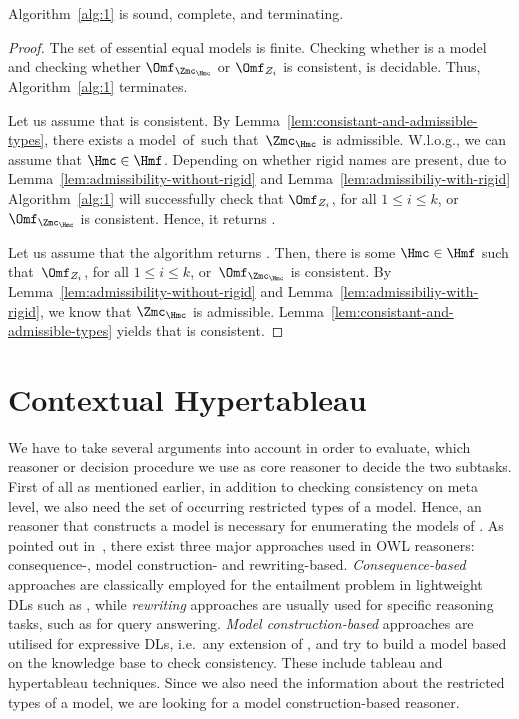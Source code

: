 \begin{lemma}\label{lem:alg1-sound-complete-terminating}
  Algorithm~\ref{alg:1} is sound, complete, and terminating.
\end{lemma}
\begin{proof}
  The set of essential equal models is finite. Checking whether \Hmc is a model and checking whether
  $\Omf_{\Zmc_{\Hmc}}$ or $\Omf_{Z_{i}}$ is consistent, is decidable. Thus, Algorithm~\ref{alg:1}
  terminates.

  Let us assume that \Bmf is consistent. By Lemma~\ref{lem:consistant-and-admissible-types}, there
  exists a model~\Hmc of~\Bmfb such that~$\Zmc_{\Hmc}$ is admissible. W.l.o.g., we can assume that
  $\Hmc\in\Hmf$. 
  Depending on whether rigid names are present, due to
  Lemma~\ref{lem:admissibility-without-rigid} and Lemma~\ref{lem:admissibiliy-with-rigid} Algorithm~\ref{alg:1} will successfully check that
  $\Omf_{Z_{i}}$, for all $1\leq i \leq k$, or $\Omf_{\Zmc_{\Hmc}}$ is consistent. Hence, it
  returns \true.

  Let us assume that the algorithm returns \true. Then, there is some $\Hmc\in\Hmf$ such that~$\Omf_{Z_{i}}$,
  for all $1\leq i \leq k$, or~$\Omf_{\Zmc_{\Hmc}}$ is consistent. By
  Lemma~\ref{lem:admissibility-without-rigid} and Lemma~\ref{lem:admissibiliy-with-rigid}, we know
  that $\Zmc_{\Hmc}$ is admissible. Lemma~\ref{lem:consistant-and-admissible-types} yields that \Bmf
  is consistent.
\end{proof}



\section{Contextual Hypertableau}
\label{sec:using-hypertableau}

We have to take several arguments into account in order to evaluate, which reasoner or decision
procedure we use as core reasoner to decide the two subtasks.
%
First of all as mentioned earlier, in addition to checking consistency on meta level, we also need
the set of occurring restricted types of a model. Hence, an reasoner that constructs a model is
necessary for enumerating the models of \Bmfb. As pointed out in~\cite{MaLHSP-ORE15}, there exist
three major approaches used in OWL reasoners: consequence-, model construction- and
rewriting-based. \emph{Consequence-based} approaches are classically employed for the entailment
problem in lightweight DLs such as \EL, while \emph{rewriting} approaches are usually used for
specific reasoning tasks, such as for query answering. \emph{Model construction-based} approaches
are utilised for expressive DLs, i.e.\ any extension of \ALC, and try to build a model based on the
knowledge base to check consistency. These include tableau and hypertableau techniques. Since we
also need the information about the restricted types of a model, we are looking for a model
construction-based reasoner.

